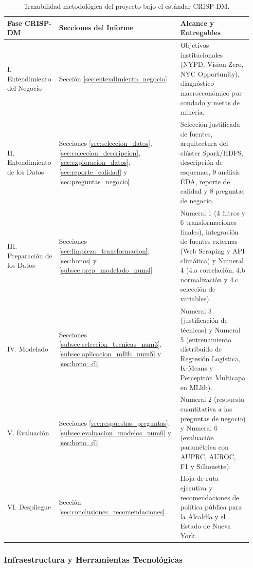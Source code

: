 \documentclass[11pt,a4paper]{article}
\begin{document}
\begin{table}[H]
\centering
\small
\renewcommand{\arraystretch}{1.25}
\begin{tabularx}{\textwidth}{p{3.6cm} p{3.8cm} X}
\toprule
\textbf{Fase CRISP-DM} & \textbf{Secciones del Informe} & \textbf{Alcance y Entregables} \\
\midrule
I. Entendimiento del Negocio & Sección \ref{sec:entendimiento_negocio} & Objetivos institucionales (NYPD, Vision Zero, NYC Opportunity), diagnóstico macroeconómico por condado y metas de minería. \\
II. Entendimiento de los Datos & Secciones \ref{sec:seleccion_datos}, \ref{sec:coleccion_descripcion}, \ref{sec:exploracion_datos}, \ref{sec:reporte_calidad} y \ref{sec:preguntas_negocio} & Selección justificada de fuentes, arquitectura del clúster Spark/HDFS, descripción de esquemas, 9 análisis EDA, reporte de calidad y 8 preguntas de negocio. \\
III. Preparación de los Datos & Secciones \ref{sec:limpieza_transformacion}, \ref{sec:bonos} y \ref{subsec:prep_modelado_num4} & Numeral 1 (4 filtros y 6 transformaciones finales), integración de fuentes externas (Web Scraping y API climática) y Numeral 4 (4.a correlación, 4.b normalización y 4.c selección de variables). \\
IV. Modelado & Secciones \ref{subsec:seleccion_tecnicas_num3}, \ref{subsec:aplicacion_mllib_num5} y \ref{sec:bono_dl} & Numeral 3 (justificación de técnicas) y Numeral 5 (entrenamiento distribuido de Regresión Logística, K-Means y Perceptrón Multicapa en MLlib). \\
V. Evaluación & Secciones \ref{sec:respuestas_preguntas}, \ref{subsec:evaluacion_modelos_num6} y \ref{sec:bono_dl} & Numeral 2 (respuesta cuantitativa a las preguntas de negocio) y Numeral 6 (evaluación paramétrica con AUPRC, AUROC, F1 y Silhouette). \\
VI. Despliegue & Sección \ref{sec:conclusiones_recomendaciones} & Hoja de ruta ejecutiva y recomendaciones de política pública para la Alcaldía y el Estado de Nueva York. \\
\bottomrule
\end{tabularx}
\caption{Trazabilidad metodológica del proyecto bajo el estándar CRISP-DM.}
\label{tab:plan_crispdm}
\end{table}

\subsubsection{Infraestructura y Herramientas Tecnológicas}
\end{document}
